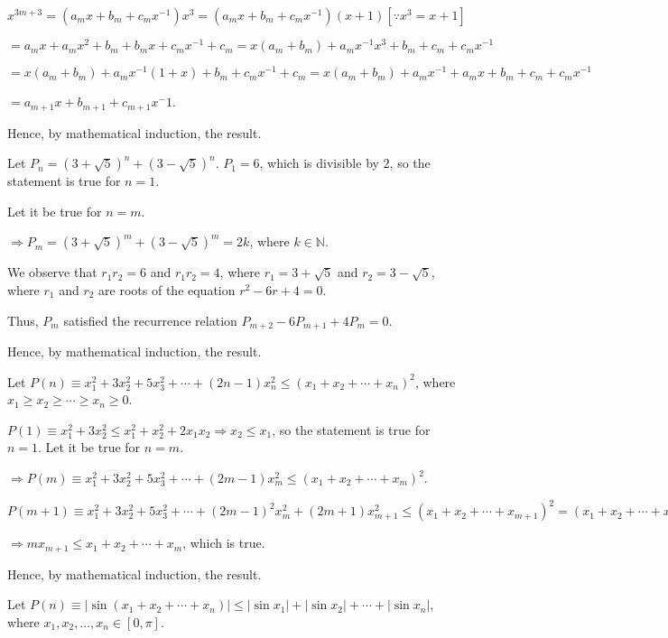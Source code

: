   $x^{3m + 3} = (a_mx + b_m + c_mx^{-1})x^3 = (a_mx + b_m + c_mx^{-1})(x + 1)[\because x^3 = x + 1]$

  $= a_mx + a_mx^2 + b_m + b_mx + c_mx^{-1} + c_m = x(a_m + b_m) + a_mx^{-1}x^3 + b_m + c_m + c_mx^{-1}$

  $= x(a_m + b_m) + a_mx^{-1}(1 + x) + b_m + c_mx^{-1} + c_m = x(a_m + b_m) + a_mx^{-1} + a_mx + b_m + c_m +
  c_mx^{-1}$

  $= a_{m + 1}x + b_{m + 1} + c_{m + 1}x^-1$.

  Hence, by mathematical induction, the result.
\item Let $P_n = (3 + \sqrt{5})^n + (3 - \sqrt{5})^n$. $P_1 = 6$, which is divisible by $2$, so the
  statement is true for $n = 1$.

  Let it be true for $n = m$.

  $\Rightarrow P_m = (3 + \sqrt{5})^m + (3 - \sqrt{5})^m = 2k$, where $k\in\mathbb{N}$.

  We observe that $r_1r_2 = 6$ and $r_1r_2 = 4$, where $r_1 = 3 + \sqrt{5}$ and $r_2 = 3 - \sqrt{5}$, where
  $r_1$ and $r_2$ are roots of the equation $r^2 - 6r + 4 = 0$.

  Thus, $P_m$ satisfied the recurrence relation $P_{m + 2} - 6P_{m + 1} + 4P_m = 0$.

  Hence, by mathematical induction, the result.
\item Let $P(n)\equiv x_1^2 + 3x_2^2 + 5x_3^2 + \cdots + (2n - 1)x_n^2\leq(x_1 + x_2 + \cdots + x_n)^2$,
  where $x_1\geq x_2\geq \cdots \geq x_n\geq 0$.

  $P(1)\equiv x_1^2 + 3x_2^2 \leq x_1^2 + x_2^2 + 2x_1x_2 \Rightarrow x_2 \leq x_1$, so the statement is
  true for $n = 1$. Let it be true for $n = m$.

  $\Rightarrow P(m)\equiv x_1^2 + 3x_2^2 + 5x_3^2 + \cdots + (2m - 1)x_m^2\leq(x_1 + x_2 + \cdots + x_m)^2$.

  $P(m + 1)\equiv x_1^2 + 3x_2^2 + 5x_3^2 + \cdots + (2m - 1)^2x_m^2 + (2m + 1)x_{m + 1}^2 \leq (x_1 + x_2 +
  \cdots + x_{m + 1})^2 = (x_1 + x_2 + \cdots + x_m)^2 + 2x_{m + 1}(x_1 + x_2 + \cdots + x_m) + x_{m + 1}^2$

  $\Rightarrow mx_{m+1} \leq x_1 + x_2 + \cdots + x_m$, which is true.

  Hence, by mathematical induction, the result.
\item Let $P(n)\equiv |\sin(x_1 + x_2 + \cdots + x_n)|\leq |\sin x_1| + |\sin x_2| + \cdots + |\sin x_n|$,
  where $x_1, x_2, \ldots, x_n \in [0, \pi]$.

